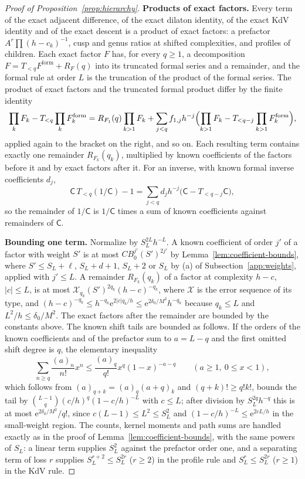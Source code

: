 \begin{proof}[Proof of Proposition~\ref{prop:hierarchy}]
\textbf{Products of exact factors.} Every term of the exact adjacent
difference, of the exact dilaton identity, of the exact KdV identity and
of the exact descent is a product of exact factors: a prefactor
$A^r\prod(h-c_k)^{-1}$, cusp and genus ratios at shifted complexities,
and profiles of children. Each exact factor $F$ has, for every $q\ge1$,
a decomposition $F=T_{<q}F^{\mathrm{form}}+R_F(q)$ into its truncated
formal series and a remainder, and the formal rule at order $L$ is the
truncation of the product of the formal series. The product of exact
factors and the truncated formal product differ by the finite identity
\begin{equation}
 \prod_kF_k-T_{<q}\prod_kF_k^{\rm form}
 =R_{F_1}(q)\prod_{k>1}F_k
 +\sum_{j<q}f_{1,j}h^{-j}\Bigl(\prod_{k>1}F_k-T_{<q-j}\prod_{k>1}F_k^{\rm form}\Bigr),
 \label{eq:FE-product}
\end{equation}
applied again to the bracket on the right, and so on. Each resulting term
contains exactly one remainder $R_{F_k}(q_k)$, multiplied by known
coefficients of the factors before it and by exact factors after it. For
an inverse, with known formal inverse coefficients $d_j$,
\begin{equation}
 \mathsf C\,T_{<q}(1/\mathsf C)-1
 =\sum_{j<q}d_jh^{-j}\bigl(\mathsf C-T_{<q-j}\mathsf C\bigr),
 \label{eq:FE-inverse}
\end{equation}
so the remainder of $1/\mathsf C$ is $1/\mathsf C$ times a sum of known
coefficients against remainders of $\mathsf C$.

\textbf{Bounding one term.} Normalize by $S_L^{2L}h^{-L}$. A known
coefficient of order $j'$ of a factor with weight $S'$ is at most
$CB_0^{j'}(S')^{2j'}$ by Lemma~\ref{lem:coefficient-bounds}, where $S'\le S_L+\ell$, $S_L+d+1$,
$S_L+2$ or $S_L$ by (a) of Subsection~\ref{app:weights}, applied with $j'\le L$. A remainder
$R_{F_k}(q_k)$ of a factor at complexity $h-c$, $|c|\le L$, is at most
$\mathscr X_{q_k}(S')^{2q_k}(h-c)^{-q_k}$, where $\mathscr X$ is the error
sequence of its type, and
$(h-c)^{-q_k}\le h^{-q_k}\mathrm{e}^{2|c|q_k/h}\le\mathrm{e}^{2\delta_0/M^2}h^{-q_k}$
because $q_k\le L$ and $L^2/h\le\delta_0/M^2$. The exact factors after
the remainder are bounded by the constants above. The known shift tails
are bounded as follows. If the orders of the known coefficients and of
the prefactor sum to $a=L-q$ and the first omitted shift degree is $q$,
the elementary inequality
\[
 \sum_{n\ge q}\frac{(a)_n}{n!}x^n\le\frac{(a)_q}{q!}x^q(1-x)^{-a-q}
 \qquad(a\ge1,\ 0\le x<1),
\]
which follows from $(a)_{q+k}=(a)_q(a+q)_k$ and $(q+k)!\ge q!k!$, bounds
the tail by $\binom{L-1}{q}(c/h)^q(1-c/h)^{-L}$ with $c\le L$; after
division by $S_L^{2q}h^{-q}$ this is at most
$\mathrm{e}^{2\delta_0/M^2}/q!$, since $c(L-1)\le L^2\le S_L^2$
and $(1-c/h)^{-L}\le\mathrm e^{2cL/h}$ in the small-weight region.
The counts, kernel moments and path sums are
handled exactly as in the proof of Lemma~\ref{lem:coefficient-bounds}, with the same powers of $S_L$: a linear
term supplies $S_L^2$ against the prefactor order one, and a separating
term of loss $r$ supplies $S_L^{r+2}\le S_L^{2r}$ ($r\ge2$) in the profile
rule and $S_L^{r}\le S_L^{2r}$ ($r\ge1$) in the KdV rule.


\end{proof}
